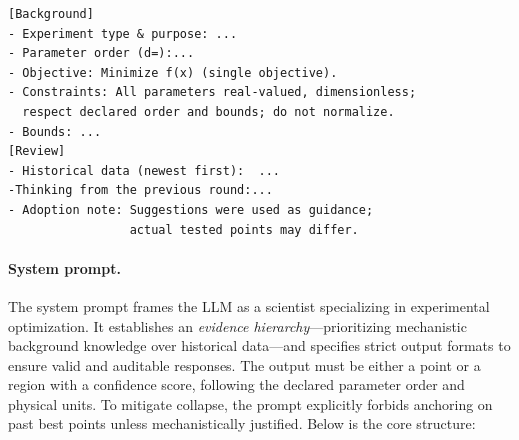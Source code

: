\documentclass{article} %
\begin{document}
\begin{lstlisting}
[Background]
- Experiment type & purpose: ...
- Parameter order (d=):...
- Objective: Minimize f(x) (single objective).
- Constraints: All parameters real-valued, dimensionless;
  respect declared order and bounds; do not normalize.
- Bounds: ...
[Review]
- Historical data (newest first):  ...
-Thinking from the previous round:...
- Adoption note: Suggestions were used as guidance; 
                 actual tested points may differ.
\end{lstlisting}
\paragraph{System prompt.}  
The system prompt frames the LLM as a scientist specializing in experimental optimization. It establishes an \emph{evidence hierarchy}—prioritizing mechanistic background knowledge over historical data—and specifies strict output formats to ensure valid and auditable responses. The output must be either a point or a region with a confidence score, following the declared parameter order and physical units. To mitigate collapse, the prompt explicitly forbids anchoring on past best points unless mechanistically justified.  
Below is the core structure:  
\newpage
\end{document}
